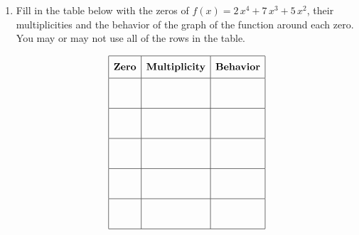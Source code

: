 \documentclass[11pt]{article}
\begin{document}
\begin{enumerate}
{{}
}

\newpage

% 

\item %
\providecommand{\stxKnowl}{}\renewcommand{\stxKnowl}[1]{#1}
\providecommand{\stxOuttro}{}\renewcommand{\stxOuttro}[1]{#1}
\providecommand{\stxTitle}{}\renewcommand{\stxTitle}[1]{#1}
\renewcommand{\stxOuttro}[1]{}
\stxKnowl{
Fill in the table below with the zeros of \(f(x) = 2 \, x^{4} + 7 \, x^{3} + 5 \, x^{2}\), their multiplicities and the behavior of the graph of the function around each zero. You may or may not use all of the rows in the table.

 \[\begin{array}{|c|c|c|} \hline \rule[-0.8em]{0pt}{2.2em} \textbf{Zero} & \textbf{Multiplicity} & \textbf{Behavior} \\ \hline \rule[-1.2em]{0pt}{3em} & & \\ \hline \rule[-1.2em]{0pt}{3em} & & \\ \hline \rule[-1.2em]{0pt}{3em} & & \\ \hline \rule[-1.2em]{0pt}{3em} & & \\ \hline \rule[-1.2em]{0pt}{3em} & & \\ \hline \end{array}\] 

\stxOuttro{
Solution

\[\begin{aligned} f(x) &= 2 \, x^{4} + 7 \, x^{3} + 5 \, x^{2} \\ &= x^2(2 \, x^{2} + 7 \, x + 5) \\ &= x^2(2x + 5)(x + 1) \end{aligned}\]

 \[\begin{array}{|c|c|c|} \hline \rule[-0.8em]{0pt}{2.2em} \textbf{Zero} & \textbf{Multiplicity} & \textbf{Behavior} \\ \hline \rule[-1.2em]{0pt}{3em} -\frac{5}{2} & 1 & \text{cross} \\ \hline \rule[-1.2em]{0pt}{3em} -1 & 1 & \text{cross} \\ \hline \rule[-1.2em]{0pt}{3em} 0 & 2 & \text{bounce} \\ \hline \rule[-1.2em]{0pt}{3em} & & \\ \hline \rule[-1.2em]{0pt}{3em} & & \\ \hline \end{array}\] 

}}
\end{enumerate}
\end{document}
